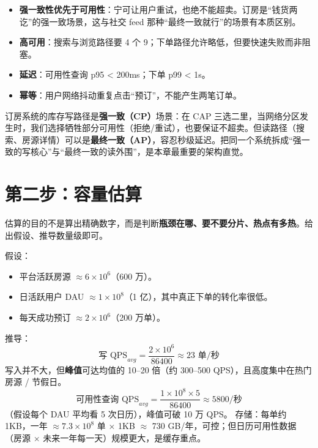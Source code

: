\begin{itemize}
  \item \textbf{强一致性优先于可用性}：宁可让用户重试，也绝不能超卖。订房是“钱货两讫”的强一致场景，这与社交 feed 那种“最终一致就行”的场景有本质区别。
  \item \textbf{高可用}：搜索与浏览路径要 4 个 9；下单路径允许略低，但要快速失败而非阻塞。
  \item \textbf{延迟}：可用性查询 p95 < 200ms；下单 p99 < 1s。
  \item \textbf{幂等}：用户网络抖动重复点击“预订”，不能产生两笔订单。
\end{itemize}

\begin{keypoint}[一致性定调]
订房系统的库存写路径是\textbf{强一致（CP）}场景：在 CAP 三选二里，当网络分区发生时，我们选择牺牲部分可用性（拒绝/重试），也要保证不超卖。但读路径（搜索、房源详情）可以是\textbf{最终一致（AP）}，容忍秒级延迟。把同一个系统拆成“强一致的写核心”与“最终一致的读外围”，是本章最重要的架构直觉。
\end{keypoint}

\section{第二步：容量估算}

估算的目的不是算出精确数字，而是判断\textbf{瓶颈在哪、要不要分片、热点有多热}。给出假设、推导数量级即可。

\begin{keypoint}
假设：
\begin{itemize}
  \item 平台活跃房源 $\approx 6 \times 10^6$（600 万）。
  \item 日活跃用户 DAU $\approx 1 \times 10^8$（1 亿），其中真正下单的转化率很低。
  \item 每天成功预订 $\approx 2 \times 10^6$（200 万单）。
\end{itemize}
推导：
\[
  \text{写 QPS}_{avg} = \frac{2\times10^6}{86400} \approx 23 \text{ 单/秒}
\]
写入并不大，但\textbf{峰值}可达均值的 10--20 倍（约 300--500 QPS），且高度集中在热门房源 / 节假日。
\[
  \text{可用性查询 QPS}_{avg} = \frac{1\times10^8 \times 5}{86400} \approx 5800 \text{/秒}
\]
（假设每个 DAU 平均看 5 次日历），峰值可破 10 万 QPS。
存储：每单约 1KB，一年 $\approx 7.3\times10^8$ 单 $\times$ 1KB $\approx$ 730 GB/年，可控；但日历可用性数据（房源 $\times$ 未来一年每一天）规模更大，是缓存重点。
\end{keypoint}

